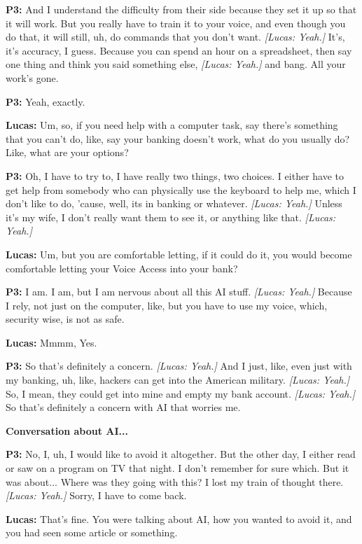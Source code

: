 \textbf{P3:} And I understand the difficulty from their side because they set it up so that it will work. But you really have to train it to your voice, and even though you do that, it will still, uh, do commands that you don't want. \textit{[Lucas: Yeah.]} It's, it's accuracy, I guess. Because you can spend an hour on a spreadsheet, then say one thing and think you said something else, \textit{[Lucas: Yeah.]} and bang. All your work's gone. 

\textbf{P3:} Yeah, exactly. 

\textbf{Lucas:} Um, so, if you need help with a computer task, say there's something that you can't do, like, say your banking doesn't work, what do you usually do? Like, what are your options? 

\textbf{P3:} Oh, I have to try to, I have really two things, two choices. I either have to get help from somebody who can physically use the keyboard to help me, which I don't like to do, 'cause, well, its in banking or whatever. \textit{[Lucas: Yeah.]} Unless it's my wife, I don't really want them to see it, or anything like that. \textit{[Lucas: Yeah.]} 

\textbf{Lucas:} Um, but you are comfortable letting, if it could do it, you would become comfortable letting your Voice Access into your bank? 

\textbf{P3:} I am. I am, but I am nervous about all this AI stuff. \textit{[Lucas: Yeah.]} Because I rely, not just on the computer, like, but you have to use my voice, which, security wise, is not as safe. 

\textbf{Lucas:} Mmmm, Yes. 

\textbf{P3:} So that's definitely a concern. \textit{[Lucas: Yeah.]} And I just, like, even just with my banking, uh, like, hackers can get into the American military. \textit{[Lucas: Yeah.]} So, I mean, they could get into mine and empty my bank account. \textit{[Lucas: Yeah.]} So that's definitely a concern with AI that worries me. 

\textbf{Conversation about AI...} 

\textbf{P3:} No, I, uh, I would like to avoid it altogether. But the other day, I either read or saw on a program on TV that night. I don't remember for sure which. But it was about... Where was they going with this? I lost my train of thought there. \textit{[Lucas: Yeah.]} Sorry, I have to come back. 

\textbf{Lucas:} That's fine. You were talking about AI, how you wanted to avoid it, and you had seen some article or something. 

